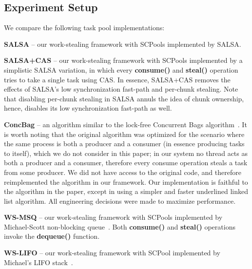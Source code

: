 \subsection {Experiment Setup}
\label{sec:exp-setup}
We compare the following task pool implementations:
\begin {item*}
\item
{\bf SALSA} -- our work-stealing framework with SCPools implemented by SALSA.
\item
{\bf SALSA+CAS} -- our work-stealing framework with SCPools implemented by a simplistic SALSA variation, in which every {\bf consume()} and {\bf steal()} operation tries to take a single task using CAS. In essence, SALSA+CAS removes the effects of SALSA's low synchronization fast-path and per-chunk stealing. 
Note that disabling per-chunk stealing in SALSA annuls the idea of chunk ownership, hence, disables its low synchronization fast-path as well. 
\item
{\bf ConcBag} -- an algorithm similar to the lock-free Concurrent Bags algorithm~\cite{Sundell:2011:LAC:1989493.1989550}. 
It is worth noting that the original algorithm was optimized for the scenario where the same process is both a producer and a consumer (in essence producing tasks to itself), which we do not consider in this paper; in our system no thread acts as both a producer and a consumer, therefore every consume operation steals a task from some producer.
We did not have access to the original code, and therefore reimplemented the algorithm in our framework. Our implementation is faithful to the algorithm in the paper, except in using a simpler and faster underlined linked list algorithm. All engineering decisions were made to maximize performance. 
\item
{\bf WS-MSQ} -- our work-stealing framework with SCPools implemented by Michael-Scott non-blocking queue~\cite{Michael:1996:SFP:248052.248106}. Both {\bf consume()} and {\bf steal()} operations invoke the {\bf dequeue()} function. 
\item
{\bf WS-LIFO} -- our work-stealing framework with SCPool implemented by Michael's LIFO stack~\cite{Michael:2004:HPS:987524.987595}. 
\end {item*} 


